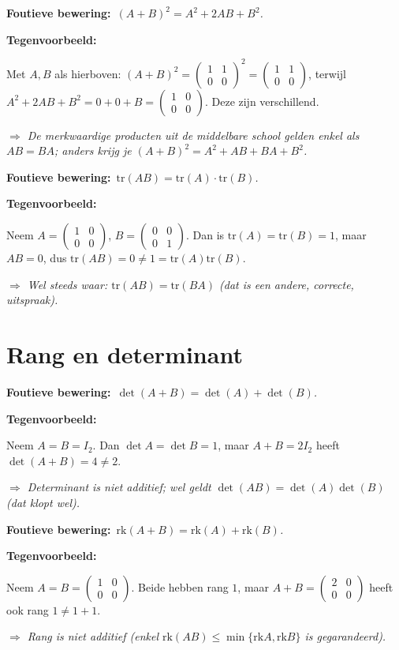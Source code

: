 \documentclass[10pt,a4paper]{article}
\newenvironment{ce}[1]{%
  \par\noindent\textbf{Foutieve bewering:}~\textit{#1}\par\noindent\textbf{Tegenvoorbeeld:}~\ignorespaces
}{%
  \par\vspace{5pt}\normalfont
}
\newcommand{\concl}[1]{\par\noindent\textit{$\Rightarrow$ #1}}
\begin{document}
\begin{ce}{$(A+B)^2=A^2+2AB+B^2$.}
Met $A,B$ als hierboven: $(A+B)^2=\begin{pmatrix}1&1\\0&0\end{pmatrix}^2=\begin{pmatrix}1&1\\0&0\end{pmatrix}$, terwijl $A^2+2AB+B^2=0+0+B=\begin{pmatrix}1&0\\0&0\end{pmatrix}$. Deze zijn verschillend.
\concl{De merkwaardige producten uit de middelbare school gelden enkel als $AB=BA$; anders krijg je $(A+B)^2=A^2+AB+BA+B^2$.}
\end{ce}

\begin{ce}{$\mathrm{tr}(AB)=\mathrm{tr}(A)\cdot\mathrm{tr}(B)$.}
Neem $A=\begin{pmatrix}1&0\\0&0\end{pmatrix}$, $B=\begin{pmatrix}0&0\\0&1\end{pmatrix}$. Dan is $\mathrm{tr}(A)=\mathrm{tr}(B)=1$, maar $AB=0$, dus $\mathrm{tr}(AB)=0\ne1=\mathrm{tr}(A)\mathrm{tr}(B)$.
\concl{Wel steeds waar: $\mathrm{tr}(AB)=\mathrm{tr}(BA)$ (dat is een andere, correcte, uitspraak).}
\end{ce}

\section{Rang en determinant}

\begin{ce}{$\det(A+B)=\det(A)+\det(B)$.}
Neem $A=B=I_2$. Dan $\det A=\det B=1$, maar $A+B=2I_2$ heeft $\det(A+B)=4\ne2$.
\concl{Determinant is niet additief; wel geldt $\det(AB)=\det(A)\det(B)$ (dat klopt wel).}
\end{ce}

\begin{ce}{$\mathrm{rk}(A+B)=\mathrm{rk}(A)+\mathrm{rk}(B)$.}
Neem $A=B=\begin{pmatrix}1&0\\0&0\end{pmatrix}$. Beide hebben rang $1$, maar $A+B=\begin{pmatrix}2&0\\0&0\end{pmatrix}$ heeft ook rang $1\ne1+1$.
\concl{Rang is niet additief (enkel $\mathrm{rk}(AB)\le\min\{\mathrm{rk}A,\mathrm{rk}B\}$ is gegarandeerd).}
\end{ce}
\end{document}

